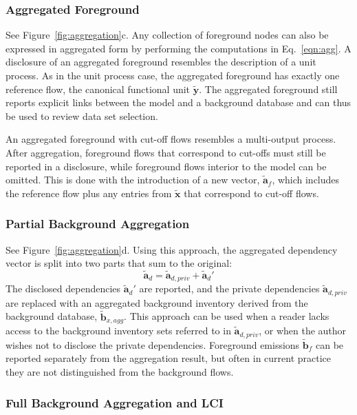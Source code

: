 \subsubsection{Aggregated Foreground}

See Figure~\ref{fig:aggregation}c. Any collection of foreground nodes can also be expressed in aggregated form by performing the computations in Eq.~\ref{eqn:agg}.  A disclosure of an aggregated foreground resembles the description of a unit process.  As in the unit process case, the aggregated foreground has exactly one reference flow, the canonical functional unit $\tilde{\mathbf{y}}$.  The aggregated foreground still reports explicit links between the model and a background database and can thus be used to review data set selection.

An aggregated foreground with cut-off flows resembles a multi-output process.  After aggregation, foreground flows that correspond to cut-offs must still be reported in a disclosure, while foreground flows interior to the model can be omitted.  This is done with the introduction of a new vector, $\tilde{\mathbf{a}}_f$, which includes the reference flow plus any entries from $\tilde{\mathbf{x}}$ that correspond to cut-off flows.  

\subsubsection{Partial Background Aggregation}

See Figure~\ref{fig:aggregation}d.  Using this approach, the
 aggregated dependency vector is split into two parts that sum to the original:
\begin{equation}
 \tilde{\mathbf{a}}_d = \tilde{\mathbf{a}}_{d,priv} + \tilde{\mathbf{a}}_d'
\end{equation}
The disclosed dependencies $\tilde{\mathbf{a}}_d'$ are reported, and the private dependencies $\tilde{\mathbf{a}}_{d,priv}$ are replaced with an aggregated background inventory derived from the background database, $\tilde{\mathbf{b}}_{x,agg}$.  This approach can be used when a reader lacks access to the background inventory sets referred to in $\tilde{\mathbf{a}}_{d,priv}$, or when the author wishes not to disclose the private dependencies.  Foreground emissions $\tilde{\mathbf{b}}_f$ can be reported separately from the aggregation result, but often in current practice they are not distinguished from the background flows.  

\subsubsection{Full Background Aggregation and LCI}

